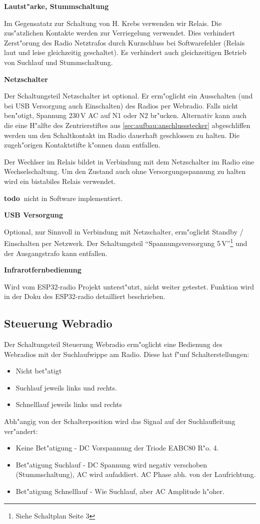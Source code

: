 \documentclass[ngerman,11pt,parskip=half] {scrartcl}
\newcommand {\todo} {\textbf{\color{red} todo\ }}
\begin{document}
\textbf{Lautst"arke, Stummschaltung}

Im Gegensatatz zur Schaltung von H. Krebs verwenden wir Relais. Die zus"atzlichen Kontakte werden zur Verriegelung verwendet. Dies verhindert Zerst"orung des Radio Netztrafos durch Kurzschluss bei Softwarefehler (Relais laut und leise gleichzeitig geschaltet). Es verhindert auch gleichzeitigen Betrieb von Suchlauf und Stummschaltung.

\textbf{Netzschalter}

Der Schaltungsteil Netzschalter ist optional. Er erm"oglicht ein Ausschalten (und bei USB Versorgung auch Einschalten) des Radios per Webradio. Falls nicht ben"otigt, Spannung 230\,V AC auf N1 oder N2 br"ucken. Alternativ kann auch die eine H"alfte des Zentrierstiftes aus \ref{sec:aufbau:anschlussstecker} abgeschliffen werden um den Schaltkontakt im Radio dauerhaft geschlossen zu halten. Die zugeh"origen Kontaktstifte k"onnen dann entfallen.

Der Wechlser im Relais bildet in Verbindung mit dem Netzschalter im Radio eine Wechselschaltung. Um den Zustand auch ohne Versorgungsspannung zu halten wird ein bistabiles Relais verwendet.

\todo nicht in Software implementiert.

\textbf{USB Versorgung}

Optional, nur Sinnvoll in Verbindung mit Netzschalter, erm"oglicht Standby / Einschalten per Netzwerk. Der Schaltungsteil "`Spannungsversorgung 5\,V"'\footnote{Siehe Schaltplan Seite 3} und der Ausgangstrafo kann entfallen.

\textbf{Infrarotfernbedienung}

Wird vom ESP32-radio Projekt unterst"utzt, nicht weiter getestet. Funktion wird in der Doku des ESP32-radio detailliert beschrieben.

\subsection{Steuerung Webradio} \label{sec:schaltung:steuern-web}

Der Schaltungsteil Steuerung Webradio erm"oglicht eine Bedienung des Webradios mit der Suchlaufwippe am Radio. Diese hat f"unf Schalterstellungen:
\begin{itemize}
\item Nicht bet"atigt
\item Suchlauf jeweils links und rechts.
\item Schnelllauf jeweils links und rechts
\end{itemize}
Abh"angig von der Schalterposition wird das Signal auf der Suchlaufleitung ver"andert:
\begin{itemize}
\item Keine Bet"atigung - DC Vorspannung der Triode EABC80 R"o. 4.
\item Bet"atigung Suchlauf - DC Spannung wird negativ verschoben (Stummschaltung), AC wird aufaddiert. AC Phase abh. von der Laufrichtung.
\item Bet"atigung Schnelllauf - Wie Suchlauf, aber AC Amplitude h"oher.
\end{itemize}
\end{document}
